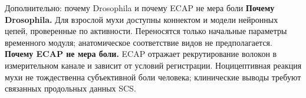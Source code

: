 \begin{frame}{Дополнительно: почему Drosophila и почему ECAP не мера боли}
\textbf{Почему Drosophila.} Для взрослой мухи доступны коннектом и модели нейронных цепей, проверенные по активности. Переносятся только начальные параметры временного модуля; анатомическое соответствие видов не предполагается.
\SlideGap
\textbf{Почему ECAP не мера боли.} ECAP отражает рекрутирование волокон в измерительном канале и зависит от условий регистрации. Ноцицептивная реакция мухи не тождественна субъективной боли человека; клинические выводы требуют связанных продольных данных SCS.
\end{frame}
